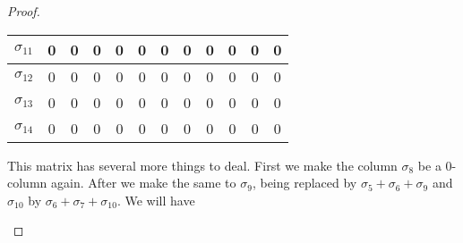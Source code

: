 \begin{proof}
\begin{enumerate}
\begin{center}
\begin{tabular}{|c|c|c|c|c|c|c|c|c|c|c|c|}
            $\sigma_{11}$ & 0                  & 0          & 0          & 0          & 0          & 0          & 0             & 0             & 0             & 0             & 0             \\ \hline
            $\sigma_{12}$ & 0                  & 0          & 0          & 0          & 0          & 0          & 0             & 0             & 0             & 0             & 0             \\ \hline
            $\sigma_{13}$ & 0                  & 0          & 0          & 0          & 0          & 0          & 0             & 0             & 0             & 0             & 0             \\ \hline
            $\sigma_{14}$ & 0                  & 0          & 0          & 0          & 0          & 0          & 0             & 0             & 0             & 0             & 0             \\ \hline
        \end{tabular}
    \end{center}

    This matrix has several more things to deal. First we make the column
    $\sigma_8$ be a 0-column again. After we make the same to $\sigma_9$,
    being replaced by $\sigma_5 + \sigma_6 + \sigma_9$ and $\sigma_{10}$ by
    $\sigma_6 + \sigma_7 + \sigma_{10}$. We will have  


\end{enumerate}
\end{proof}
